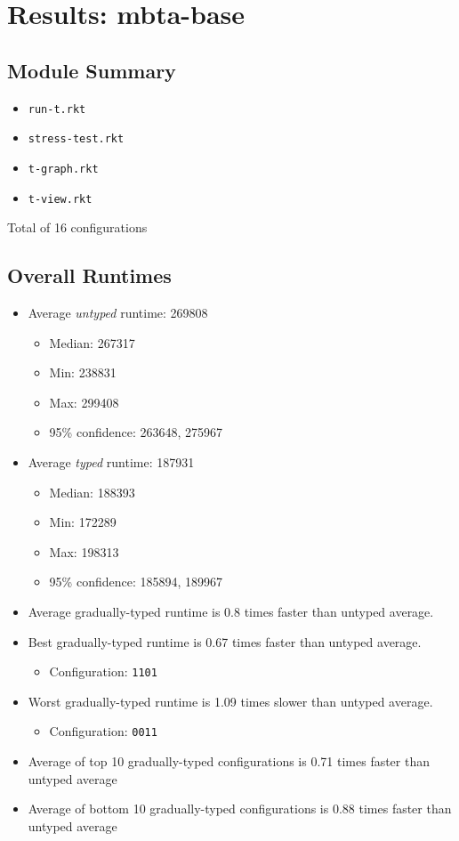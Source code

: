 \documentclass{article}
\newcommand{\mono}[1]{\texttt{#1}}
\begin{document}
\section{Results: mbta-base}

\subsection{Module Summary}
\begin{itemize}
\item \mono{run-t.rkt}
\item \mono{stress-test.rkt}
\item \mono{t-graph.rkt}
\item \mono{t-view.rkt}\end{itemize}
Total of 16 configurations

\subsection{Overall Runtimes}
\begin{itemize}
\item Average \emph{untyped} runtime: 269808
  \begin{itemize}
  \item Median: 267317
  \item Min: 238831
  \item Max: 299408
  \item 95\% confidence: 263648, 275967
  \end{itemize}
\item Average \emph{typed} runtime: 187931
  \begin{itemize}
  \item Median: 188393
  \item Min: 172289
  \item Max: 198313
  \item 95\% confidence: 185894, 189967
  \end{itemize}
\item Average gradually-typed runtime is 0.8 times faster than untyped average.
\item Best gradually-typed runtime is 0.67 times faster than untyped average.
\begin{itemize}\item Configuration: \mono{1101}\end{itemize}
\item Worst gradually-typed runtime is 1.09 times slower than untyped average.
\begin{itemize}\item Configuration: \mono{0011}\end{itemize}
\item Average of top 10 gradually-typed configurations is 0.71 times faster than untyped average
\item Average of bottom 10 gradually-typed configurations is 0.88 times faster than untyped average
\end{itemize}
\end{document}

